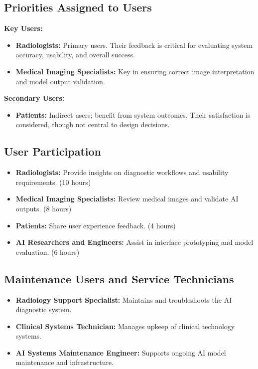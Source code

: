 \documentclass[12pt]{article}
\begin{document}
\subsection{Priorities Assigned to Users}
\textbf{Key Users:}
\begin{itemize}
    \item \textbf{Radiologists:} Primary users. Their feedback is critical for evaluating system accuracy, usability, and overall success.
    \item \textbf{Medical Imaging Specialists:} Key in ensuring correct image interpretation and model output validation.
\end{itemize}

\textbf{Secondary Users:}
\begin{itemize}
    \item \textbf{Patients:} Indirect users; benefit from system outcomes. Their satisfaction is considered, though not central to design decisions.
\end{itemize}

\subsection{User Participation}
\begin{itemize}
    \item \textbf{Radiologists:} Provide insights on diagnostic workflows and usability requirements. (10 hours)
    \item \textbf{Medical Imaging Specialists:} Review medical images and validate AI outputs. (8 hours)
    \item \textbf{Patients:} Share user experience feedback. (4 hours)
    \item \textbf{AI Researchers and Engineers:} Assist in interface prototyping and model evaluation. (6 hours)
\end{itemize}

\subsection{Maintenance Users and Service Technicians}
\begin{itemize}
    \item \textbf{Radiology Support Specialist:} Maintains and troubleshoots the AI diagnostic system.
    \item \textbf{Clinical Systems Technician:} Manages upkeep of clinical technology systems.
    \item \textbf{AI Systems Maintenance Engineer:} Supports ongoing AI model maintenance and infrastructure.
\end{itemize}
\end{document}
